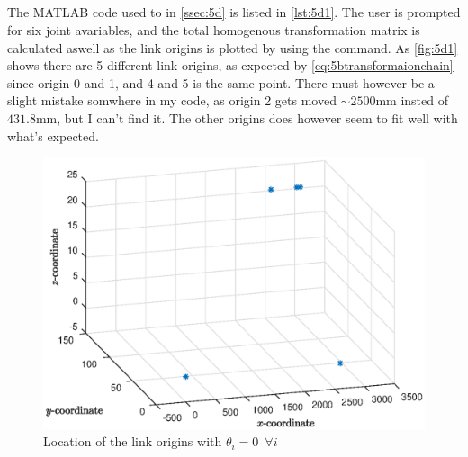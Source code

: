 \documentclass[a4paper]{scrartcl}
\begin{document}
\subsection{}\label{ssec:5d} %
The MATLAB code used to in \autoref{ssec:5d} is listed in \autoref{lst:5d1}. The user is prompted for six joint avariables, and the total homogenous transformation matrix is calculated aswell as the link origins is plotted by using the  command. As \autoref{fig:5d1} shows there are 5 different link origins, as expected by \eqref{eq:5btransformaionchain} since origin 0 and 1, and 4 and 5 is the same point. There must however be a slight mistake somwhere in my code, as origin 2 gets moved $\sim 2500 \si{\mm}$ insted of $431.8\si{\mm}$, but I can't find it. The other origins does however seem to fit well with what's expected.

\begin{figure}[ht!]
    \centering
    \includegraphics[width = .95\textwidth]{5d1.eps}
    \caption{Location of the link origins with $\theta_i = 0 \enspace \forall i$}
    \label{fig:5d1}
\end{figure}
\end{document}
